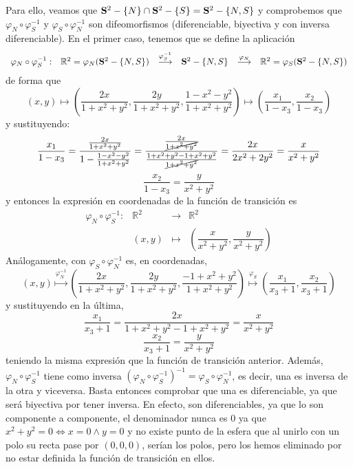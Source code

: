 \begin{ejer}
\begin{enumerate}[a)]
            \begin{sol}
                Para ello, veamos que $\bold S^2 - \{N\} \cap \bold S^2 - \{S\} = \bold S^2 - \{N, S\}$ y comprobemos que $\varphi_N \circ \varphi_S^{-1}$ y $\varphi_S \circ \varphi_N^{-1}$ son difeomorfismos (diferenciable, biyectiva y con inversa diferenciable). En el primer caso, tenemos que se define la aplicaci\'on
                $$\begin{array}{rrrcll}
                     \varphi_N \circ \varphi_S^{-1} : & \mathbb R^2 = \varphi_N(\bold S^2 - \{N, S\}) & \overset{\varphi_S^{-1}}{\longrightarrow} & \bold S^2 - \{N, S\}& \overset{\varphi_N}{\longrightarrow} & \mathbb R^2 = \varphi_S(\bold S^2 - \{N, S\}) \\   
                \end{array}$$
                de forma que $$(x,y)  \longmapsto  \left( \frac{2x}{1 + x^2 + y^2} , \frac{2y}{1 + x^2 + y^2}, \frac{1 - x^2 - y^2}{1 + x^2 + y^2}\right) \longmapsto \left( \dfrac{x_1}{1-x_3}, \dfrac{x_2}{1-x_3}\right)$$
                y sustituyendo:
                $$\dfrac{x_1}{1-x_3}=\dfrac{\frac{2x}{1 + x^2 + y^2}}{1-\frac{1 - x^2 - y^2}{1 + x^2 + y^2}} = \dfrac{\frac{2x}{\cancel{1 + x^2 + y^2}}}{\frac{1+x^2+y^2-1 +x^2 + y^2}{\cancel{1 + x^2 + y^2}}} = \dfrac{2x}{2x^2 + 2y^2} =\dfrac{x}{x^2 + y^2}$$
                $$ \dfrac{x_2}{1-x_3} = \dfrac{y}{x^2 + y^2}$$
                    y entonces la expresi\'on en coordenadas de la funci\'on de transici\'on es
                    $$\begin{array}{rrcl}
                     \varphi_N \circ \varphi_S^{-1} : & \mathbb R^2 & \longrightarrow & \mathbb R^2 \\
                     & (x,y) & \longmapsto & \left(  \dfrac{x}{x^2 + y^2}, \dfrac{y}{x^2 + y^2}\right)
                \end{array}$$
                An\'alogamente, con $\varphi_S \circ \varphi_N^{-1}$ es, en coordenadas,
                $$(x,y) \overset{\varphi_N^{-1}}{\longmapsto} \left( \dfrac{2x}{1 + x^2 + y^2} , \dfrac{2y}{1 + x^2 + y^2}, \dfrac{-1 + x^2 + y^2}{1 + x^2 + y^2}\right)  \overset{\varphi_S}{\longmapsto} \left( \dfrac{x_1}{x_3+1}, \dfrac{x_2}{x_3+1}\right)  $$
                y sustituyendo en la \'ultima, 
                $$\dfrac{x_1}{x_3+1} = \dfrac{2x}{1 + x^2 + y^2 - 1 + x^2 + y^2} = \dfrac{x}{x^2+y^2}$$
                $$\dfrac{x_2}{x_3+1} = \dfrac{y}{x^2 + y^2}$$
                teniendo la misma expresi\'on que la funci\'on de transici\'on anterior. Adem\'as,  $\varphi_N \circ \varphi_S^{-1}$ tiene como inversa $(\varphi_N \circ \varphi_S^{-1})^{-1} = \varphi_S \circ \varphi_N^{-1}$, es decir, una es inversa de la otra y viceversa. Basta entonces comprobar que una es diferenciable, ya que ser\'a biyectiva por tener inversa. En efecto, son diferenciables, ya que lo son componente a componente, el denominador nunca es $0$ ya que $x^2+y^2 = 0 \iff x=0 \wedge y=0$ y no existe punto de la esfera que al unirlo con un polo su recta pase por $(0,0,0)$, ser\'ian los polos, pero los hemos eliminado por no estar definida la funci\'on de transici\'on en ellos.

\end{sol}
\end{enumerate}
\end{ejer}
